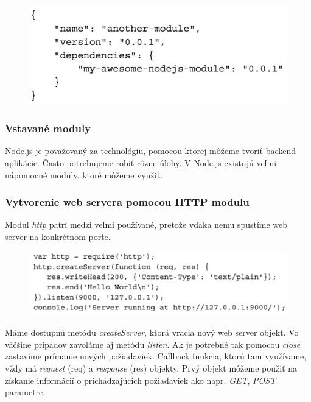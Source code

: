 \begin{figure}[H]
  \centering
  \includegraphics[scale=0.7]{img/npm/npm-overview-dependency.png}
\end{figure}

\subsubsection{Vstavané moduly}
Node.js je považovaný za technológiu, pomocou ktorej môžeme tvoriť backend aplikácie. Často potrebujeme robiť rôzne úlohy. V Node.js existujú veľmi nápomocné moduly, ktoré môžeme využiť.\cite{nodejs-by-example}

\subsubsection{Vytvorenie web servera pomocou HTTP modulu}
Modul \textit{http} patrí medzi veľmi používané, pretože vďaka nemu spustíme web server na konkrétnom porte.

\begin{figure}[H]
  \centering
  \includegraphics[scale=0.7]{img/npm/npm-http-module.png}
\end{figure}

Máme dostupnú metódu \textit{createServer}, ktorá vracia nový web server objekt. Vo väčšine prípadov zavoláme aj metódu \textit{listen}. Ak je potrebné tak pomocou \textit{close} zastavíme prímanie nových požiadaviek. Callback funkcia, ktorú tam využívame, vždy má \textit{request} (req) a \textit{response} (res) objekty. Prvý objekt môžeme použiť na získanie informácií o prichádzajúcich požiadaviek ako napr. \textit{GET}, \textit{POST} parametre.\cite{nodejs-by-example}

